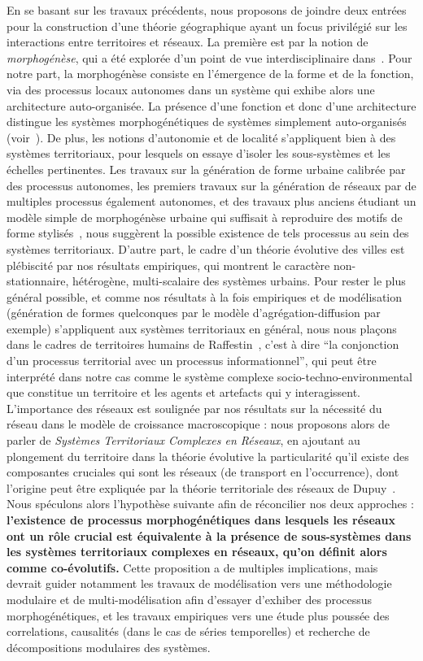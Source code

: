 En se basant sur les travaux précédents, nous proposons de joindre deux entrées pour la construction d'une théorie géographique ayant un focus privilégié sur les interactions entre territoires et réseaux. La première est par la notion de \emph{morphogénèse}, qui a été explorée d'un point de vue interdisciplinaire dans~\cite{antelope2016interdisciplinary}. Pour notre part, la morphogénèse consiste en l'émergence de la forme et de la fonction, via des processus locaux autonomes dans un système qui exhibe alors une architecture auto-organisée. La présence d'une fonction et donc d'une architecture distingue les systèmes morphogénétiques de systèmes simplement auto-organisés (voir~\cite{doursat2012morphogenetic}). De plus, les notions d'autonomie et de localité s'appliquent bien à des systèmes territoriaux, pour lesquels on essaye d'isoler les sous-systèmes et les échelles pertinentes. Les travaux sur la génération de forme urbaine calibrée par des processus autonomes, les premiers travaux sur la génération de réseaux par de multiples processus également autonomes, et des travaux plus anciens étudiant un modèle simple de morphogénèse urbaine qui suffisait à reproduire des motifs de forme stylisés~\cite{raimbault2014hybrid}, nous suggèrent la possible existence de tels processus au sein des systèmes territoriaux. D'autre part, le cadre d'un théorie évolutive des villes est plébiscité par nos résultats empiriques, qui montrent le caractère non-stationnaire, hétérogène, multi-scalaire des systèmes urbains. Pour rester le plus général possible, et comme nos résultats à la fois empiriques et de modélisation (génération de formes quelconques par le modèle d'agrégation-diffusion par exemple) s'appliquent aux systèmes territoriaux en général, nous nous plaçons dans le cadres de territoires humains de Raffestin~\cite{raffestin1988reperes}, c'est à dire ``la conjonction d'un processus territorial avec un processus informationnel'', qui peut être interprété dans notre cas comme le système complexe socio-techno-environmental que constitue un territoire et les agents et artefacts qui y interagissent. L'importance des réseaux est soulignée par nos résultats sur la nécessité du réseau dans le modèle de croissance macroscopique : nous proposons alors de parler de \emph{Systèmes Territoriaux Complexes en Réseaux}, en ajoutant au plongement du territoire dans la théorie évolutive la particularité qu'il existe des composantes cruciales qui sont les réseaux (de transport en l'occurrence), dont l'origine peut être expliquée par la théorie territoriale des réseaux de Dupuy~\cite{dupuy1987vers}. Nous spéculons alors l'hypothèse suivante afin de réconcilier nos deux approches : \textbf{l'existence de processus morphogénétiques dans lesquels les réseaux ont un rôle crucial est équivalente à la présence de sous-systèmes dans les systèmes territoriaux complexes en réseaux, qu'on définit alors comme co-évolutifs.} Cette proposition a de multiples implications, mais devrait guider notamment les travaux de modélisation vers une méthodologie modulaire et de multi-modélisation afin d'essayer d'exhiber des processus morphogénétiques, et les travaux empiriques vers une étude plus poussée des correlations, causalités (dans le cas de séries temporelles) et recherche de décompositions modulaires des systèmes.



\stars







